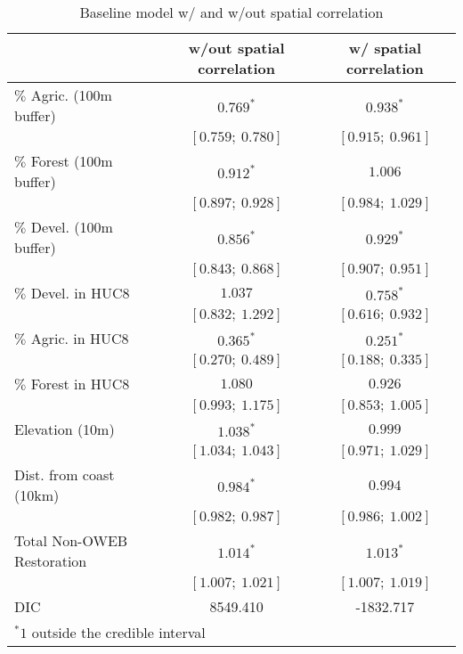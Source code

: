 
\begin{table}
\caption{Baseline model w/ and w/out spatial correlation}
\begin{center}
\begin{tabular}{l c c }
\hline
                           & w/out spatial correlation & w/ spatial correlation \\
\hline
$\%$  Agric. (100m buffer) & $0.769^{*}$       & $0.938^{*}$       \\
                           & $[0.759;\ 0.780]$ & $[0.915;\ 0.961]$ \\
$\%$  Forest (100m buffer) & $0.912^{*}$       & $1.006$           \\
                           & $[0.897;\ 0.928]$ & $[0.984;\ 1.029]$ \\
$\%$  Devel. (100m buffer) & $0.856^{*}$       & $0.929^{*}$       \\
                           & $[0.843;\ 0.868]$ & $[0.907;\ 0.951]$ \\
$\%$  Devel. in HUC8       & $1.037$           & $0.758^{*}$       \\
                           & $[0.832;\ 1.292]$ & $[0.616;\ 0.932]$ \\
$\%$  Agric. in HUC8       & $0.365^{*}$       & $0.251^{*}$       \\
                           & $[0.270;\ 0.489]$ & $[0.188;\ 0.335]$ \\
$\%$  Forest in HUC8       & $1.080$           & $0.926$           \\
                           & $[0.993;\ 1.175]$ & $[0.853;\ 1.005]$ \\
Elevation (10m)            & $1.038^{*}$       & $0.999$           \\
                           & $[1.034;\ 1.043]$ & $[0.971;\ 1.029]$ \\
Dist. from coast (10km)    & $0.984^{*}$       & $0.994$           \\
                           & $[0.982;\ 0.987]$ & $[0.986;\ 1.002]$ \\
Total Non-OWEB Restoration & $1.014^{*}$       & $1.013^{*}$       \\
                           & $[1.007;\ 1.021]$ & $[1.007;\ 1.019]$ \\
\hline
DIC                        & 8549.410          & -1832.717         \\
\hline
\multicolumn{3}{l}{\scriptsize{$^* 1$ outside the credible interval}}
\end{tabular}
\label{table:basemods}
\end{center}
\end{table}
